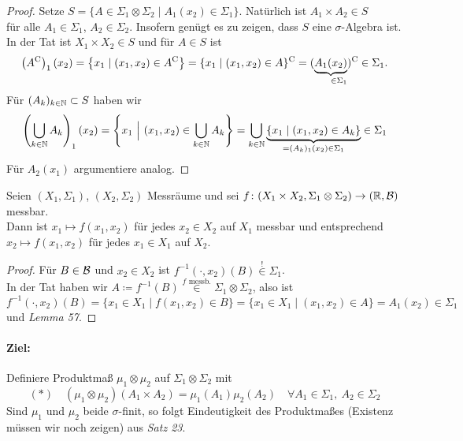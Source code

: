 \documentclass[skript.tex]{subfiles}
\begin{document}
	\begin{proof}
		Setze $S = \{A \in \Sigma_1\otimes\Sigma_2 \mid A_1(x_2)\in\Sigma_1\}$. Natürlich ist $A_1\times A_2 \in S$ \\
		für alle $A_1\in\Sigma_1$, $A_2\in\Sigma_2$. Insofern genügt es zu zeigen, dass $S$ eine $\sigma$-Algebra ist. \\
		In der Tat ist $X_1 \times X_2 \in S$ und für $A \in S$ ist
		\[
			\left(\cp{A}\right)_1(x_2) = \left\{x_1 \mid (x_1,x_2) \in \cp{A}\right\}
			= \cp{\{x_1 \mid (x_1,x_2) \in A\}}
			= \cp{(\underbrace{A_1(x_2)}_{\mathrlap{\in\Sigma_1}})} \in \Sigma_1.
		\]
		Für $(A_k)_{k\in\mathbb{N}} \subset S$ haben wir
		\[
			\left( \bigcup_{k\in\mathbb{N}} A_k \right)_1(x_2)
			= \left\{ x_1\ \Big\vert\ (x_1,x_2) \in \bigcup_{k\in\mathbb{N}}A_k \right\}
			= \bigcup_{k\in\mathbb{N}}\underbrace{\{x_1 \mid (x_1,x_2) \in A_k\}}_{= (A_k)_1(x_2) \in \Sigma_1} \in \Sigma_1
		\]
		Für $A_2(x_1)$ argumentiere analog.
	\end{proof}

	\begin{cor}
		Seien $(X_1,\Sigma_1)$, $(X_2,\Sigma_2)$ Messräume und sei $f \colon (X_1 \times X_2, \Sigma_1 \otimes \Sigma_2) \to (\mathbb{R},\mathcal{B})$ messbar. \\
		Dann ist  $x_1 \mapsto f(x_1,x_2)$ für jedes $x_2 \in X_2$ auf $X_1$ messbar und entsprechend $x_2 \mapsto f(x_1,x_2)$ für jedes $x_1 \in X_1$ auf $X_2$.
	\end{cor}
	\begin{proof}
		Für $B \in \mathcal{B}$ und $x_2 \in X_2$ ist $f^{-1}(\cdot,x_2)(B) \overset{\text{!}}{\in} \Sigma_1$.\\
		In der Tat haben wir $A \coloneqq f^{-1}(B) \overset{f \text{ messb.}}{\in} \Sigma_1 \otimes \Sigma_2$, also ist
		\[
			f^{-1}(\cdot,x_2)(B)
			= \{x_1 \in X_1 \mid f(x_1,x_2) \in B \}
			= \{x_1 \in X_1 \mid (x_1,x_2) \in A \}
			= A_1(x_2) \in \Sigma_1
		\]
		und \emph{Lemma 57}.
	\end{proof}

	\paragraph{Ziel:} Definiere Produktmaß $\mu_1 \otimes \mu_2$ auf $\Sigma_1 \otimes \Sigma_2$ mit
	\[
		(\ast) \quad (\mu_1 \otimes \mu_2)(A_1 \times A_2) = \mu_1(A_1)\mu_2(A_2) \quad \forall A_1\in\Sigma_1,\ A_2\in\Sigma_2
	\]
	Sind $\mu_1$ und $\mu_2$ beide $\sigma$-finit, so folgt Eindeutigkeit des Produktmaßes (Existenz müssen wir noch zeigen) aus \emph{Satz 23}.
	
\end{document}
